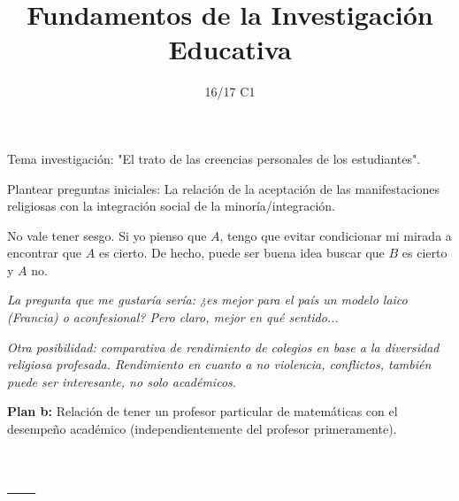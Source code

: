 \documentclass[palatino,nochap]{apuntes}
\title{Fundamentos de la Investigación Educativa}
\author{}
\date{16/17 C1}
\begin{document}
\pagestyle{plain}
\maketitle

\tableofcontents
\newpage

Tema investigación: "El trato de las creencias personales de los estudiantes".

Plantear preguntas iniciales: La relación de la aceptación de las manifestaciones religiosas con la integración social de la minoría/integración.

No vale tener sesgo. Si yo pienso que $A$, tengo que evitar condicionar mi mirada a encontrar que $A$ es cierto. De hecho, puede ser buena idea buscar que $B$ es cierto y $A$ no.

\textit{La pregunta que me gustaría sería: ¿es mejor para el país un modelo laico (Francia) o aconfesional? Pero claro, mejor en qué sentido... }


\textit{Otra posibilidad: comparativa de rendimiento de colegios en base a la diversidad religiosa profesada. Rendimiento en cuanto a no violencia, conflictos, también puede ser interesante, no solo académicos.}


\textbf{Plan b:} Relación de tener un profesor particular de matemáticas con el desempeño académico (independientemente del profesor primeramente).




\appendix

\chapter{---}


\printindex
\end{document}
